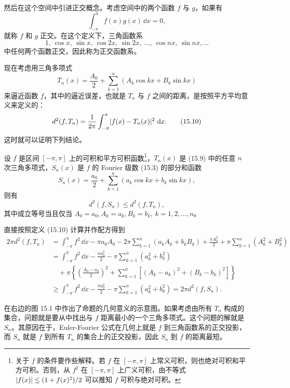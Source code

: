然后在这个空间中引进正交概念。考虑空间中的两个函数 $f$ 与 $g$，如果有
\[
  \int_{-\pi}^{\pi}f(x)g(x)\,\dd x=0,
\]
就称 $f$ 和 $g$ 正交。在这个定义下，三角函数系
\[
  1,\ \cos x,\ \sin x,\ \cos2x,\ \sin2x,\ \ldots,\ \cos nx,\ \sin nx,\ldots
\]
中任何两个函数正交，因此称为正交函数系。

现在考虑用三角多项式
\begin{equation}
  T_n(x)=\frac{A_0}{2}+\sum_{k=1}^{n}(A_k\cos kx+B_k\sin kx)
  \tag{15.9}
  \label{eq:15.9}
\end{equation}
来逼近函数 $f$，其中的逼近误差，也就是 $T_n$ 与 $f$ 之间的距离，是按照平方平均意义来定义的：
\begin{equation}
  d^2(f,T_n)=\frac1{2\pi}\int_{-\pi}^{\pi}\lvert f(x)-T_n(x)\rvert^2\,\mathop{}\!\mathrm{d} x.
  \tag{15.10}
  \label{eq:15.10}
\end{equation}
这时就可以证明下列结论。

\begin{xproposition}
设 $f$ 是区间 $[-\pi,\pi]$ 上的可积和平方可积函数\footnote{关于 $f$ 的条件要作些解释。若 $f$ 在 $[-\pi,\pi]$ 上常义可积，则也绝对可积和平方可积。否则，从 $f^2$ 在 $[-\pi,\pi]$ 上广义可积，由不等式 $\lvert f(x)\rvert\le(1+f(x)^2)/2$ 可以推知 $f$ 可积与绝对可积。}，$T_n(x)$ 是 (15.9) 中的任意 $n$ 次三角多项式，$S_n(x)$ 是 $f$ 的 Fourier 级数 (15.3) 的部分和函数
\[
  S_n(x)=\frac{a_0}{2}+\sum_{k=1}^{n}(a_k\cos kx+b_k\sin kx),
\]
则有
\[
  d^2(f,S_n)\le d^2(f,T_n),
\]
其中成立等号当且仅当 $A_0=a_0,A_k=a_k,B_k=b_k,\ k=1,2,\ldots,n$。
\end{xproposition}

\begin{xproof}
直接按照定义 (15.10) 计算并作配方得到
\begin{align*}
  2\pi d^2(f,T_n)
  &=\int_{-\pi}^{\pi}f^2\,\dd x-\pi a_0A_0-2\pi\sum_{k=1}^{n}(a_kA_k+b_kB_k)
    +\frac{\pi A_0^2}{2}+\pi\sum_{k=1}^{n}(A_k^2+B_k^2)\\
  &=\int_{-\pi}^{\pi}f^2\,\dd x-\frac{\pi a_0^2}{2}-\pi\sum_{k=1}^{n}(a_k^2+b_k^2)\\
  &\quad+\pi\left\{\left(\frac{A_0-a_0}{2}\right)^2
      +\sum_{k=1}^{n}\left[(A_k-a_k)^2+(B_k-b_k)^2\right]\right\}\\
  &\ge \int_{-\pi}^{\pi}f^2\,\dd x-\frac{\pi a_0^2}{2}-\pi\sum_{k=1}^{n}(a_k^2+b_k^2)
  =2\pi d^2(f,S_n).
\end{align*}
\end{xproof}

\begin{xremark}
在右边的图 15.1 中作出了命题的几何意义的示意图。如果考虑由所有 $T_n$ 构成的集合，问题就是要从中找出与 $f$ 距离最小的一个三角多项式。这个问题的解就是 $S_n$。其原因在于，Euler-Fourier 公式在几何上就是 $f$ 到三角函数系的正交投影，而 $S_n$ 就是 $f$ 到所有 $T_n$ 的集合上的正交投影，因此 $S_n$ 到 $f$ 的距离最短。
\end{xremark}

